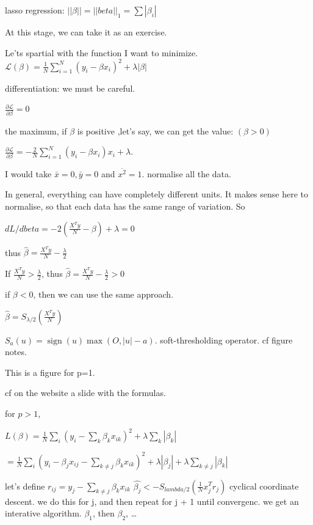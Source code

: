 \documentclass[a4paper]{tufte-book}
\DeclareMathOperator{\sign}{sign}
\begin{document}
lasso regression: $||\beta|| = ||beta||_1 = \sum |\beta_i|$

At this stage, we can take it as an exercise.

Le'ts spartial with the function I want to minimize.
$\mathcal{L} (\beta) = \frac{1}{N} \sum_{i=1}^N (y_i - \beta x_i)^2 + \lambda |\beta|$

differentiation: we must be careful.

$\frac{\partial\mathcal{L}}{\partial\beta} = 0$

the maximum, if $\beta$ is positive ,let's say, we can get the value:
$(\beta >0)$

$\frac{\partial\mathcal{L}}{\partial\beta} = - \frac{2}{N} \sum_{i=1}^N (y_i - \beta x_i)x_i + \lambda.$

I would take $\bar{x} =0, \bar{y} = 0$ and $\overline{x^2} = 1$. normalise all the
data.

In general, everything can have completely different units. It makes sense here
to normalise, so that each data has the same range of variation.
So

$dL/d beta = -2 (\frac{X^T y}{N} - \beta) + \lambda = 0$

thus $\hat \beta = \frac{X^Ty}{N}- \frac{\lambda}{2}$

If $\frac{X^Ty}{N} > \frac{\lambda}{2}$, thus
$\hat{\beta} = \frac{X^Ty}{N} - \frac{\lambda}{2} >0$

if $\beta < 0$, then we can use the same approach.

$\hat \beta= S_{\lambda/2} \left( \frac{X^T y}{N} \right)$

$S_a (u) = \sign(u) \max(O,|u|-a)$. soft-thresholding operator. cf figure notes.

This is a figure for p=1.

cf on the website a slide with the formulas.

for $p>1$,

$L(\beta) = \frac{1}{N} \sum_i (y_i - \sum_k \beta_k x_{ik} )^2 + \lambda \sum_k |\beta_k|$

$= \frac{1}{N} \sum_i (y_i - \beta_j x_{ij} - \sum_{k\neq j} \beta_k x_{ik} )^2 + \lambda |\beta_j| + \lambda \sum_{k\neq j} |\beta_k|$

let's define $r_{ij} = y_j - \sum_{k\neq j} \beta_k x_{ik}$
$\hat{\beta_j} <- S_{lambda/2} (\frac{1}{N} x_j^T r_j)$
cyclical coordinate descent. we do this for j, and then repeat for j + 1 until
convergenc.
we get an interative algorithm. $\beta_1$, then $\beta_2$, \ldots
\end{document}
